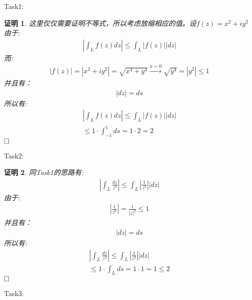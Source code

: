 \documentclass{ctexart}
\newcommand{\。}{．} %
\newenvironment{lanse}{
    \begin{tcolorbox}[breakable,enhanced, colback=qlan, boxrule=0pt, frame hidden,
        borderline west={0.7mm}{0.1mm}{slan}]
    }
    {\end{tcolorbox}}
\newenvironment{huangse}{
    \begin{tcolorbox}[breakable,enhanced, colback=qhuang, boxrule=0pt, frame hidden,
        borderline west={0.7mm}{0.1mm}{shuang}]
    }
    {\end{tcolorbox}}
\newenvironment{zise}{
    \begin{tcolorbox}[breakable,enhanced, colback=qzi, boxrule=0pt, frame hidden,
        borderline west={0.7mm}{0.1mm}{szi}]
    }
    {\end{tcolorbox}}
\theoremstyle{t} %
\newtheorem{dlhj}{\color{shuang} 定理}[subsection]
\newtheorem{lthj}{\color{szi} }
\newtheorem*{zmhj}{\color{slan} 证明}
\newenvironment{zm}{\begin{lanse}\begin{zmhj}}{$\hfill \square$\end{zmhj}\end{lanse}}
\newenvironment{dl}{\begin{huangse}\begin{dlhj}}{\end{dlhj}\end{huangse}}
\newenvironment{lt}{\begin{zise}\begin{lthj}}{\end{lthj}\end{zise}}
\begin{document}

Task1:
\begin{zm}
    这里仅仅需要证明不等式，所以考虑放缩相应的值。设$f(z)=x^2+iy^2$由于:
    \begin{align*}
        \left|\int_{L}^{}f(z)dz\right|\le \int_{L}^{}|f(z)||dz|
    \end{align*}
    而:
    \begin{align*}
        |f(z)|=|x^2+iy^2|=\sqrt{x^4+y^4}\xrightarrow{x=0}\sqrt{y^4}=|y^2|\le 1
    \end{align*}
    并且有：
    \begin{align*}
        |dz|=ds
    \end{align*}
    所以有:
    \begin{align*}
        \left|\int_{L}^{}f(z)dz\right|\le \int_{L}^{}|f(z)||dz|\\
        \le 1\cdot \int_{-1}^{1}ds=1\cdot 2=2
    \end{align*}
\end{zm}
Task2:
\begin{zm}
    同Task1的思路有:
    \begin{align*}
        \left|\int_{L}^{}\frac{dz}{z^2}\right|\le \int_{L}^{}\left|\frac{1}{z^2}\right||dz|
    \end{align*}
    由于:
    \begin{align*}
        \left|\frac{1}{z^2}\right|=\frac{1}{|z|^2}\le 1
    \end{align*}
    并且有：
    \begin{align*}
        |dz|=ds
    \end{align*}
    所以有:
    \begin{align*}
        \left|\int_{L}^{}\frac{dz}{z^2}\right|\le \int_{L}^{}\left|\frac{1}{z^2}\right||dz|\\
        \le 1\cdot \int_{L}ds=1\cdot 1=1\le 2
    \end{align*}
\end{zm}
Task3:
\end{document}
